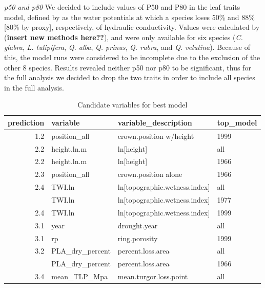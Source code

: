 \documentclass[]{article}
\begin{document}
\emph{p50 and p80} We decided to include values of P50 and P80 in the
leaf traits model, defined by \citep{anderegg_meta-analysis_2016} as the
water potentials at which a species loses 50\% and 88\% {[}80\% by
proxy{]}, respectively, of hydraulic conductivity. Values were
calculated by (\textbf{insert new methods here??}), and were only
available for six species (\emph{C. glabra}, \emph{L. tulipifera},
\emph{Q. alba}, \emph{Q. prinus}, \emph{Q. rubra}, and \emph{Q.
velutina}). Because of this, the model runs were considered to be
incomplete due to the exclusion of the other 8 species. Results revealed
neither p50 nor p80 to be significant, thus for the full analysis we
decided to drop the two traits in order to include all species in the
full analysis.

\begin{table}[!h]

\caption{\label{tab:Table S2}Candidate variables for best model}
\centering
\begin{tabular}{rlll}
\toprule
prediction & variable & variable\_description & top\_model\\
\midrule
1.2 & position\_all & crown.position w/height & 1999\\
2.2 & height.ln.m & ln[height] & all\\
2.2 & height.ln.m & ln[height] & 1966\\
2.3 & position\_all & crown.position alone & 1966\\
2.4 & TWI.ln & ln[topographic.wetness.index] & all\\
\addlinespace
2.4 & TWI.ln & ln[topographic.wetness.index] & 1977\\
2.4 & TWI.ln & ln[topographic.wetness.index] & 1999\\
3.1 & year & drought.year & all\\
3.1 & rp & ring.porosity & 1999\\
3.2 & PLA\_dry\_percent & percent.loss.area & all\\
\addlinespace
3.2 & PLA\_dry\_percent & percent.loss.area & 1966\\
3.4 & mean\_TLP\_Mpa & mean.turgor.loss.point & all\\
\bottomrule
\end{tabular}
\end{table}
\end{document}
